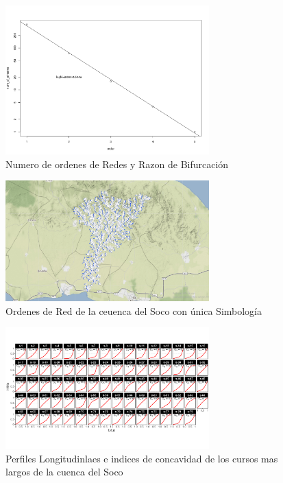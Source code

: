 \documentclass[11pt,]{article}
\begin{document}
\begin{figure}
\centering
\includegraphics[width=0.70000\textwidth]{num redes razon bif.png}
\caption{Numero de ordenes de Redes y Razon de
Bifurcación\label{mapaseis}}
\end{figure}

\begin{figure}
\centering
\includegraphics[width=0.70000\textwidth]{unica sim.png}
\caption{Ordenes de Red de la ceuenca del Soco con única
Simbología\label{mapasiete}}
\end{figure}

\begin{figure}
\centering
\includegraphics[width=0.70000\textwidth]{mas largos.png}
\caption{Perfiles Longitudinlaes e indices de concavidad de los cursos
mas largos de la cuenca del Soco\label{mapaocho}}
\end{figure}
\end{document}

